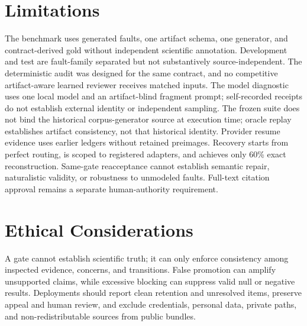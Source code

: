 \documentclass[11pt]{article}
\begin{document}
\section{Limitations}

The benchmark uses generated faults, one artifact schema, one generator, and
contract-derived gold without independent scientific annotation. Development
and test are fault-family separated but not substantively source-independent.
The deterministic audit was designed for the same contract, and no competitive
artifact-aware learned reviewer receives matched inputs. The model diagnostic
uses one local model and an artifact-blind fragment prompt; self-recorded
receipts do not establish external identity or independent sampling. The frozen
suite does not bind the historical corpus-generator source at execution time;
oracle replay establishes artifact consistency, not that historical identity.
Provider resume evidence uses earlier ledgers without retained preimages. Recovery starts
from perfect routing, is scoped to registered adapters, and achieves only 60\%
exact reconstruction. Same-gate reacceptance cannot establish semantic repair,
naturalistic validity, or robustness to unmodeled faults. Full-text citation
approval remains a separate human-authority requirement.

\section{Ethical Considerations}

A gate cannot establish scientific truth; it can only enforce consistency
among inspected evidence, concerns, and transitions. False promotion can
amplify unsupported claims, while excessive blocking can suppress valid null
or negative results. Deployments should report clean retention and unresolved
items, preserve appeal and human review, and exclude credentials, personal
data, private paths, and non-redistributable sources from public bundles.


\end{document}
